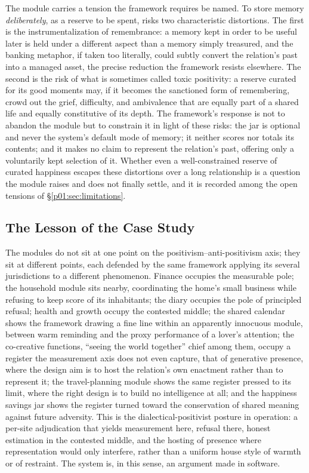 The module carries a tension the framework requires be named. To store memory \emph{deliberately}, as a reserve to be spent, risks two characteristic distortions. The first is the instrumentalization of remembrance: a memory kept in order to be useful later is held under a different aspect than a memory simply treasured, and the banking metaphor, if taken too literally, could subtly convert the relation's past into a managed asset, the precise reduction the framework resists elsewhere. The second is the risk of what is sometimes called toxic positivity: a reserve curated for its good moments may, if it becomes the sanctioned form of remembering, crowd out the grief, difficulty, and ambivalence that are equally part of a shared life and equally constitutive of its depth. The framework's response is not to abandon the module but to constrain it in light of these risks: the jar is optional and never the system's default mode of memory; it neither scores nor totals its contents; and it makes no claim to represent the relation's past, offering only a voluntarily kept selection of it. Whether even a well-constrained reserve of curated happiness escapes these distortions over a long relationship is a question the module raises and does not finally settle, and it is recorded among the open tensions of §\ref{p01:sec:limitations}.

\subsection{The Lesson of the Case Study}

The modules do not sit at one point on the positivism--anti-positivism axis; they sit at different points, each defended by the same framework applying its several jurisdictions to a different phenomenon. Finance occupies the measurable pole; the household module sits nearby, coordinating the home's small business while refusing to keep score of its inhabitants; the diary occupies the pole of principled refusal; health and growth occupy the contested middle; the shared calendar shows the framework drawing a fine line within an apparently innocuous module, between warm reminding and the proxy performance of a lover's attention; the co-creative functions, ``seeing the world together'' chief among them, occupy a register the measurement axis does not even capture, that of generative presence, where the design aim is to host the relation's own enactment rather than to represent it; the travel-planning module shows the same register pressed to its limit, where the right design is to build no intelligence at all; and the happiness savings jar shows the register turned toward the conservation of shared meaning against future adversity. This is the dialectical-positivist posture in operation: a per-site adjudication that yields measurement here, refusal there, honest estimation in the contested middle, and the hosting of presence where representation would only interfere, rather than a uniform house style of warmth or of restraint. The system is, in this sense, an argument made in software.



